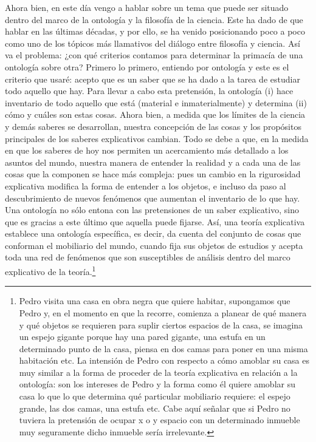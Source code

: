 \documentclass[]{book}
\begin{document}
Ahora bien, en este día vengo a hablar sobre un tema que puede ser
situado dentro del marco de la ontología y la filosofía de la ciencia.
Este ha dado de que hablar en las últimas décadas, y por ello, se ha
venido posicionando poco a poco como uno de los tópicos más llamativos
del diálogo entre filosofía y ciencia. Así va el problema: ¿con qué
criterios contamos para determinar la primacía de una ontología sobre
otra? Primero lo primero, entiendo por ontología y este es el criterio
que usaré: acepto que es un saber que se ha dado a la tarea de estudiar
todo aquello que hay. Para llevar a cabo esta pretensión, la ontología
(i) hace inventario de todo aquello que está (material e
inmaterialmente) y determina (ii) cómo y cuáles son estas cosas. Ahora
bien, a medida que los límites de la ciencia y demás saberes se
desarrollan, nuestra concepción de las cosas y los propósitos
principales de los saberes explicativos cambian. Todo se debe a que, en
la medida en que los saberes de hoy nos permiten un acercamiento más
detallado a los asuntos del mundo, nuestra manera de entender la
realidad y a cada una de las cosas que la componen se hace más compleja:
pues un cambio en la rigurosidad explicativa modifica la forma de
entender a los objetos, e incluso da paso al descubrimiento de nuevos
fenómenos que aumentan el inventario de lo que hay. Una ontología no
sólo entona con las pretensiones de un saber explicativo, sino que es
gracias a este último que aquella puede fijarse. Así, una teoría
explicativa establece una ontología específica, es decir, da cuenta del
conjunto de cosas que conforman el mobiliario del mundo, cuando fija sus
objetos de estudios y acepta toda una red de fenómenos que son
susceptibles de análisis dentro del marco explicativo de la
teoría.\footnote{Pedro visita una casa en obra negra que quiere habitar,
  supongamos que Pedro y, en el momento en que la recorre, comienza a
  planear de qué manera y qué objetos se requieren para suplir ciertos
  espacios de la casa, se imagina un espejo gigante porque hay una pared
  gigante, una estufa en un determinado punto de la casa, piensa en dos
  camas para poner en una misma habitación etc. La intensión de Pedro
  con respecto a cómo amoblar su casa es muy similar a la forma de
  proceder de la teoría explicativa en relación a la ontología: son los
  intereses de Pedro y la forma como él quiere amoblar su casa lo que lo
  que determina qué particular mobiliario requiere: el espejo grande,
  las dos camas, una estufa etc. Cabe aquí señalar que si Pedro no
  tuviera la pretensión de ocupar x o y espacio con un determinado
  inmueble muy seguramente dicho inmueble sería irrelevante.}
\end{document}
